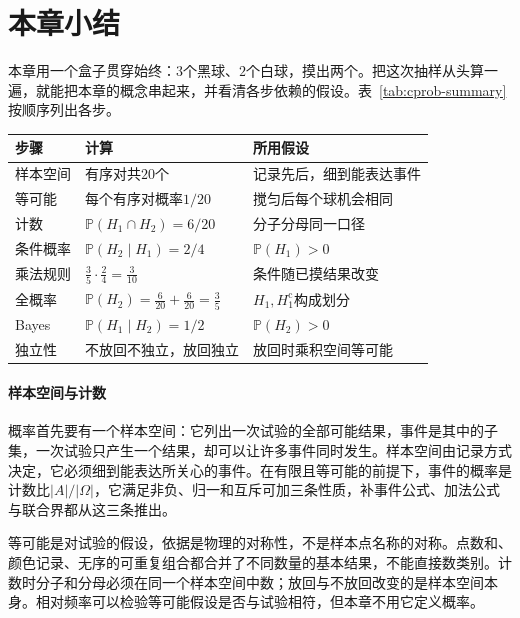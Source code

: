 \section{本章小结}
\label{sec:cprob-summary}

本章用一个盒子贯穿始终：$3$个黑球、$2$个白球，摸出两个。把这次抽样从头算一遍，就能把本章的概念串起来，并看清各步依赖的假设。表~\ref{tab:cprob-summary}按顺序列出各步。

\begin{BookInlineTable}
  \centering
  \caption{摸球问题中各步的计算与所用假设}
  \label{tab:cprob-summary}
  \begin{tabular}{lll}
    \toprule
    步骤 & 计算 & 所用假设 \\
    \midrule
    样本空间 & 有序对共$20$个 & 记录先后，细到能表达事件 \\
    等可能 & 每个有序对概率$1/20$ & 搅匀后每个球机会相同 \\
    计数 & $\mathbb{P}(H_1\cap H_2)=6/20$ & 分子分母同一口径 \\
    条件概率 & $\mathbb{P}(H_2\mid H_1)=2/4$ & $\mathbb{P}(H_1)>0$ \\
    乘法规则 & $\tfrac35\cdot\tfrac24=\tfrac{3}{10}$ & 条件随已摸结果改变 \\
    全概率 & $\mathbb{P}(H_2)=\tfrac{6}{20}+\tfrac{6}{20}=\tfrac35$ & $H_1,H_1^{\mathrm{c}}$构成划分 \\
    Bayes & $\mathbb{P}(H_1\mid H_2)=1/2$ & $\mathbb{P}(H_2)>0$ \\
    独立性 & 不放回不独立，放回独立 & 放回时乘积空间等可能 \\
    \bottomrule
  \end{tabular}
\end{BookInlineTable}

\paragraph{样本空间与计数}
概率首先要有一个样本空间：它列出一次试验的全部可能结果，事件是其中的子集，一次试验只产生一个结果，却可以让许多事件同时发生。样本空间由记录方式决定，它必须细到能表达所关心的事件。在有限且等可能的前提下，事件的概率是计数比$\lvert A\rvert/\lvert\Omega\rvert$，它满足非负、归一和互斥可加三条性质，补事件公式、加法公式与联合界都从这三条推出。

等可能是对试验的假设，依据是物理的对称性，不是样本点名称的对称。点数和、颜色记录、无序的可重复组合都合并了不同数量的基本结果，不能直接数类别。计数时分子和分母必须在同一个样本空间中数；放回与不放回改变的是样本空间本身。相对频率可以检验等可能假设是否与试验相符，但本章不用它定义概率。


